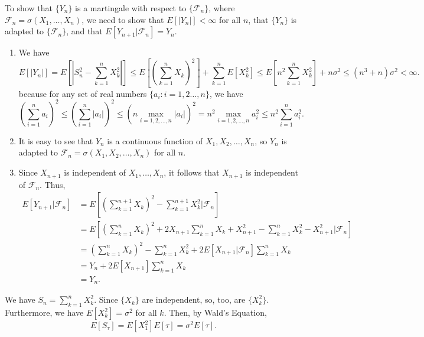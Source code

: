 \documentclass{homework}
\newcommand{\fil}{\mathcal{F}}
\begin{document}
	\question To show that $\{Y_n\}$ is a martingale with respect to $\{\fil_n\}$, where $\fil_n = \sigma(X_1,\dots, X_n)$, we need to show that $E[|Y_n|] < \infty$ for all $n$, that $\{Y_n\}$ is adapted to $\{\fil_n\}$, and that $E[Y_{n+1}|\fil_n] = Y_n$.
	\begin{enumerate}
		\item We have
			\begin{equation*}
				E[|Y_n|] = E\left[\left|S_n^2 - \sum_{k=1}^nX_k^2\right|\right] \le E\left[\left(\sum_{k=1}^nX_k\right)^2\right] + \sum_{k=1}^nE[X_k^2] \le E\left[n^2\sum_{k=1}^nX_k^2\right] + n\sigma^2 \le (n^3+n)\sigma^2 < \infty.
			\end{equation*}
		because for any set of real numbers $\{a_i : i=1,2\dots,n\}$, we have
		\begin{equation*}
			\left(\sum_{i=1}^na_i\right)^2 \le \left(\sum_{i=1}^n |a_i|\right)^2 \le \left(n\max_{i=1,2,\dots,n}|a_i|\right)^2 = n^2\max_{i=1,2,\dots,n}a_i^2 \le n^2\sum_{i=1}^na_i^2.
		\end{equation*}
		\item It is easy to see that $Y_n$ is a continuous function of $X_1,X_2,\dots, X_n$, so $Y_n$ is adapted to $\fil_n = \sigma(X_1,X_2,\dots,X_n)$ for all $n$.
		\item Since $X_{n+1}$ is independent of $X_1,\dots, X_n$, it follows that $X_{n+1}$ is independent of $\fil_n$. Thus,
		\begin{equation*}
			\begin{aligned}
			E[Y_{n+1}|\fil_n] &= E\left[\left(\sum_{k=1}^{n+1}X_k\right)^2 - \sum_{k=1}^{n+1}X_k^2\Bigg|\fil_n\right] \\[0.5em]
			&= E\left[\left(\sum_{k=1}^nX_k\right)^2 + 2X_{n+1}\sum_{k=1}^nX_k + X_{n+1}^2 - \sum_{k=1}^nX_k^2 - X_{n+1}^2\Bigg|\fil_n\right] \\[0.5em]
			&= \left(\sum_{k=1}^nX_k\right)^2 - \sum_{k=1}^nX_k^2 + 2E[X_{n+1}|\fil_n]\sum_{k=1}^nX_k \\
			&= Y_n + 2E[X_{n+1}]\sum_{k=1}^nX_k \\
			&= Y_n.
			\end{aligned}
		\end{equation*}
	\end{enumerate}
	
	We have $S_n = \sum\limits_{k=1}^nX_k^2$. Since $\{X_k\}$ are independent, so, too, are $\{X_k^2\}$. Furthermore, we have $E[X_k^2] = \sigma^2$ for all $k$. Then, by Wald's Equation,
	\begin{equation*}
		E[S_\tau] = E[X_1^2]E[\tau] = \sigma^2E[\tau].
	\end{equation*}
	
\end{document}
